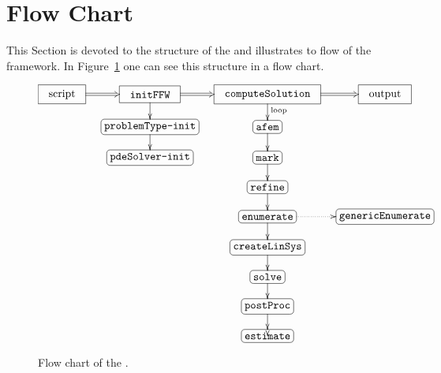 \section{Flow Chart}
\label{sect:FlowChart}

\noindent This Section is devoted to the structure of the \FFW and illustrates to flow of the framework. In Figure~\ref{sect:FlowChart.fig.FFW-flowchart} one can see this structure in a flow chart.

\begin{figure}[ht!]
\footnotesize
\begin{equation*}
\xymatrix@-1eM{
    *+<2ex>[F]{ \phantom{I}\text{script}\phantom{I} }           \ar@{=>}[r]
&   *+<2ex>[F]{ \phantom{I}\code{initFFW}\phantom{I} }          \ar@{=>}[r]\ar@{->}[d]
&   *+<2ex>[F]{ \phantom{I}\code{computeSolution}\phantom{I} }  \ar@{=>}[r] \ar@{->}[d]^{\text{loop}}
&   *+<2ex>[F]{ \phantom{I}\text{output}\phantom{I} }
\\
& *+[F-:<3pt>]{ \code{problemType-init}} \ar@{->}[d]   &  *+[F-:<3pt>]{ \code{afem} }            \ar@{->}[d]
\\
&*+[F-:<3pt>]{ \code{pdeSolver-init}} &  *+[F-:<3pt>]{ \code{mark} }            \ar@{->}[d]
\\
&& *+[F-:<3pt>]{ \code{refine} }          \ar@{->}[d]
\\
&& *+[F-:<3pt>]{ \code{enumerate} }       \ar@{.>}[r] \ar@{->}[d]
&   *+[F-:<3pt>]{ \code{genericEnumerate} }
\\
&& *+[F-:<3pt>]{ \code{createLinSys} }    \ar@{->}[d]
\\
&& *+[F-:<3pt>]{ \code{solve} }           \ar@{->}[d]
\\
&& *+[F-:<3pt>]{ \code{postProc} }        \ar@{->}[d]
\\
&& *+[F-:<3pt>]{ \code{estimate} }        \ar@{->}'l[u] '[uu] [uu]
}
\end{equation*}
\normalsize \caption{Flow chart of the \FFW.}\label{sect:FlowChart.fig.FFW-flowchart}
\end{figure}

